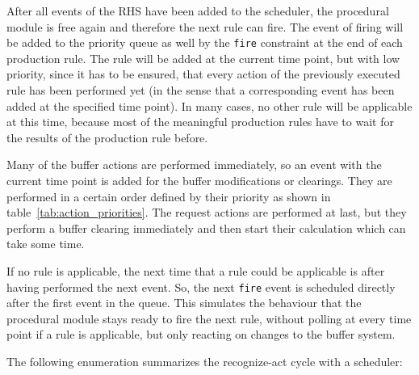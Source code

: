 After all events of the RHS have been added to the scheduler, the procedural module is free again and therefore the next rule can fire. The event of firing will be added to the priority queue as well by the \verb|fire| constraint at the end of each production rule. The rule will be added at the current time point, but with low priority, since it has to be ensured, that every action of the previously executed rule has been performed yet (in the sense that a corresponding event has been added at the specified time point). In many cases, no other rule will be applicable at this time, because most of the meaningful production rules have to wait for the results of the production rule before. 

Many of the buffer actions are performed immediately, so an event with the current time point is added for the buffer modifications or clearings. They are performed in a certain order defined by their priority as shown in table~\ref{tab:action_priorities}. The request actions are performed at last, but they perform a buffer clearing immediately and then start their calculation which can take some time. 

If no rule is applicable, the next time that a rule could be applicable is after having performed the next event. So, the next \verb|fire| event is scheduled directly after the first event in the queue. This simulates the behaviour that the procedural module stays ready to fire the next rule, without polling at every time point if a rule is applicable, but only reacting on changes to the buffer system. 


The following enumeration summarizes the recognize-act cycle with a scheduler:

